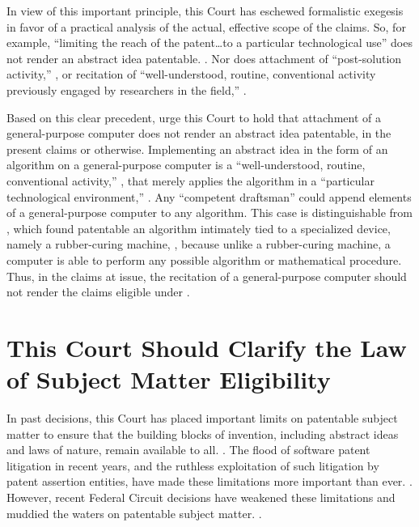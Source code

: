 \documentclass{scotus}
\begin{document}
In view of this important principle, this Court has eschewed
formalistic exegesis in favor of a practical analysis of the actual, effective
scope of the claims.
So, for example,
``limiting the reach of the patent\ldots to a
particular technological use'' does not render an abstract idea patentable.
. Nor does attachment of
``post-solution activity,''
,
or
recitation of ``well-understood, routine, conventional activity previously
engaged by researchers in the field,''
.

Based on this clear precedent, \amici urge this Court to hold that
attachment of a general-purpose computer does not render an abstract idea
patentable, in the present claims or otherwise.
Implementing an
abstract idea in the form of an algorithm on a general-purpose computer is a
``well-understood, routine, conventional activity,'' , that
merely
applies the algorithm in a ``particular technological environment,''
.
Any ``competent draftsman'' could append elements of a
general-purpose computer to any algorithm.
This case is distinguishable from , which found patentable an
algorithm intimately tied to a specialized device, namely a rubber-curing
machine, , because unlike a rubber-curing machine, a
computer is able to perform any possible algorithm or mathematical
procedure.
Thus, in the claims at issue, the recitation of a general-purpose computer
should not render the claims eligible under .



%
%
\section{This Court Should Clarify the Law of Subject Matter Eligibility}

In past decisions, this Court has placed important limits on patentable subject
matter to ensure that the building blocks of invention, including abstract ideas
and laws of nature, remain available to all. .  The flood
of software patent litigation in recent years, and the ruthless exploitation of
such litigation by patent assertion entities, have made these limitations more
important than ever. . However, recent Federal
Circuit decisions have weakened these limitations and muddied the waters on
patentable subject matter.  .
\end{document}
